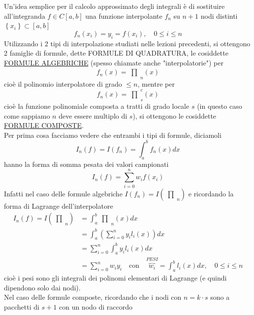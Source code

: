 \documentclass[12pt,a4paper]{article}
\newcommand{\inter}{\begin{matrix}\prod\end{matrix}}
\begin{document}
Un'idea semplice per il calcolo approssimato degli integrali è di sostituire all'integranda $f \in C[a,b]$ una funzione interpolante $f_n$ su $n+1$ nodi distinti $\left\{x_i\right\} \subset [a,b]$
\begin{equation*}
    f_n(x_i) = y_i = f(x_i), \quad 0 \leq i \leq n
\end{equation*}
Utilizzando i 2 tipi di interpolazione studiati nelle lezioni precedenti, si ottengono 2 famiglie di formule, dette FORMULE DI QUADRATURA, le cosiddette \underline{FORMULE ALGEBRICHE} (spesso chiamate anche "interpolatorie") per
\begin{equation*}
    f_n(x) = \inter_n(x)
\end{equation*}
cioè il polinomio interpolatore di grado $\leq n$, mentre per 
\begin{equation*}
    f_n(x) = \inter_s^c(x)
\end{equation*}
cioè la funzione polinomiale composta a tratti di grado locale $s$ (in questo caso come sappiamo $n$ deve essere multiplo di $s$), si ottengono le cosiddette \underline{FORMULE COMPOSTE}. \\
Per prima cosa facciamo vedere che entrambi i tipi di formule, diciamoli
\begin{equation*}
    I_n(f) = I(f_n) = \int_a^b f_n(x) dx
\end{equation*}
hanno la forma di somma pesata dei valori campionati
\begin{equation*}
    I_n(f) = \sum_{i=0}^n w_i f(x_i)
\end{equation*}
Infatti nel caso delle formule algebriche $I(f_n)=I(\inter_n)$ e ricordando la forma di Lagrange dell'interpolatore
\begin{equation*}
    \begin{split}
        I_n(f) = I(\inter_n) & = \int_a^b \inter_n(x) dx \\
        & = \int_a^b \left(\sum_{i=0}^n y_i l_i(x)\right) dx \\
        & = \sum_{i=0}^n \int_a^b y_i l_i(x) dx \\
        & = \sum_{i=0}^n w_i y_i \quad \text{con} \quad \overbrace{w_i}^{PESI} = \int_a^b l_i(x) dx, \quad 0 \leq i \leq n
    \end{split}
\end{equation*}
cioè i pesi sono gli integrali dei polinomi elementari di Lagrange (e quindi dipendono solo dai nodi). \\
Nel caso delle formule composte, ricordando che i nodi con $n=k\cdot s$ sono a pacchetti di $s+1$ con un nodo di raccordo
\end{document}
